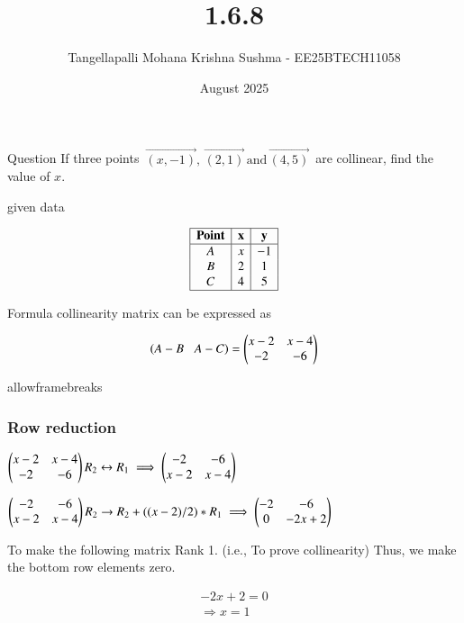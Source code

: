 \documentclass{beamer}
\title %
{1.6.8}
\date{August  2025}
\author %
{Tangellapalli Mohana Krishna Sushma - EE25BTECH11058}
\begin{document}
\frame{\titlepage}
\begin{frame}{Question}
If three points $\,\vec{(x, -1)},\, \vec{(2, 1)}\, \text{and} \, \vec{(4, 5)}\,$ are collinear, find the value of $x$.


\end{frame}
 
\begin{frame}{given data}

\[
\begin{array}{|c|c|c|}
\hline
\textbf{Point} & \textbf{x} & \textbf{y} \\
\hline
A & x & -1 \\
B & 2 & 1 \\
C & 4 & 5 \\
\hline
\end{array}
\] 

\end{frame}

\begin{frame}{Formula}
  collinearity matrix can be expressed as 

\begin{align*}
  \brak{A-B\;\;\;A-C} =\begin{myvec}{x-2 & x-4\\-2 & -6\\}\end{myvec}
\end{align*}
\end{frame}

\begin{frame}{allowframebreaks}
\frametitle{Row reduction}

$\begin{pmatrix}x-2 & x-4\\-2 & -6\end{pmatrix}
R_2 \leftrightarrow R_1 \implies \begin{pmatrix} -2 & -6 \\ x-2 & x-4 \end{pmatrix}$

$\begin{pmatrix} -2 & -6 \\ x-2 & x-4 \end{pmatrix}
R_2 \rightarrow R_2 + ((x-2)/2)*R_1 \implies \begin{pmatrix} -2 & -6 \\ 0 & -2x+2 \end{pmatrix}$

To make the following matrix Rank 1. (i.e., To prove collinearity)
Thus, we make the bottom row elements zero.

\end{frame}


\begin{align*}
-2x + 2 = 0 \\
\Rightarrow x = 1 \\
\end{align*}
\end{document}

